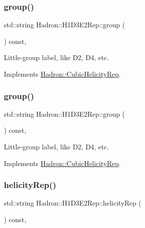 \subsubsection{\texorpdfstring{group()}{group()}\hspace{0.1cm}{\footnotesize\ttfamily [2/3]}}
{\footnotesize\ttfamily std\+::string Hadron\+::\+H1\+D3\+E2\+Rep\+::group (\begin{DoxyParamCaption}{ }\end{DoxyParamCaption}) const\hspace{0.3cm}{\ttfamily [inline]}, {\ttfamily [virtual]}}

Little-\/group label, like D2, D4, etc. 

Implements \mbox{\hyperlink{structHadron_1_1CubicHelicityRep_a101a7d76cd8ccdad0f272db44b766113}{Hadron\+::\+Cubic\+Helicity\+Rep}}.

\mbox{\label{structHadron_1_1H1D3E2Rep_aeb5e2d7d6d716039d61a8262627b7853}} 
\subsubsection{\texorpdfstring{group()}{group()}\hspace{0.1cm}{\footnotesize\ttfamily [3/3]}}
{\footnotesize\ttfamily std\+::string Hadron\+::\+H1\+D3\+E2\+Rep\+::group (\begin{DoxyParamCaption}{ }\end{DoxyParamCaption}) const\hspace{0.3cm}{\ttfamily [inline]}, {\ttfamily [virtual]}}

Little-\/group label, like D2, D4, etc. 

Implements \mbox{\hyperlink{structHadron_1_1CubicHelicityRep_a101a7d76cd8ccdad0f272db44b766113}{Hadron\+::\+Cubic\+Helicity\+Rep}}.

\mbox{\label{structHadron_1_1H1D3E2Rep_a9b18f2d67ec482a4a8d2adc6287a1571}} 
\subsubsection{\texorpdfstring{helicityRep()}{helicityRep()}\hspace{0.1cm}{\footnotesize\ttfamily [1/2]}}
{\footnotesize\ttfamily std\+::string Hadron\+::\+H1\+D3\+E2\+Rep\+::helicity\+Rep (\begin{DoxyParamCaption}{ }\end{DoxyParamCaption}) const\hspace{0.3cm}{\ttfamily [inline]}, {\ttfamily [virtual]}}

